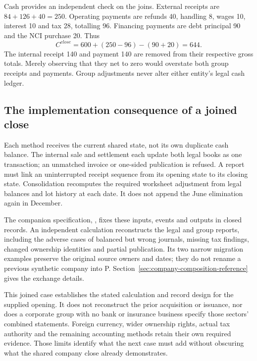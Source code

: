 Cash provides an independent check on the joins. External receipts are
\(84+126+40=250\). Operating payments are refunds 40, handling 8, wages 10,
interest 10 and tax 28, totalling 96. Financing payments are debt principal 90
and the NCI purchase 20. Thus
\begin{equation}
 C^{close}=600+(250-96)-(90+20)=644.
\end{equation}
The internal receipt 140 and payment 140 are removed from their respective
gross totals. Merely observing that they net to zero would overstate both
group receipts and payments. Group adjustments never alter either entity's
legal cash ledger.

\subsection{The implementation consequence of a joined close}

Each method receives the current shared state, not its own duplicate cash
balance. The internal sale and settlement each update both legal books as one
transaction; an unmatched invoice or one-sided publication is refused. A
report must link an uninterrupted receipt sequence from its opening state to
its closing state. Consolidation recomputes the required worksheet adjustment
from legal balances and lot history at each date. It does not append the June
elimination again in December.

The companion specification, , fixes these inputs,
events and outputs in closed records. An independent calculation reconstructs
the legal and group reports, including the adverse cases of balanced but wrong
journals, missing tax findings, changed ownership identities and partial
publication. Its two narrow migration examples preserve the original source
owners and dates; they do not rename a previous synthetic company into P.
Section~\ref{sec:company-composition-reference} gives the exchange details.

This joined case establishes the stated calculation and record design for the
supplied opening. It does not reconstruct the prior acquisition or issuance,
nor does a corporate group with no bank or insurance business specify those
sectors' combined statements. Foreign currency, wider ownership rights, actual
tax authority and the remaining accounting methods retain their own required
evidence. Those limits identify what the next case must add without obscuring
what the shared company close already demonstrates.
